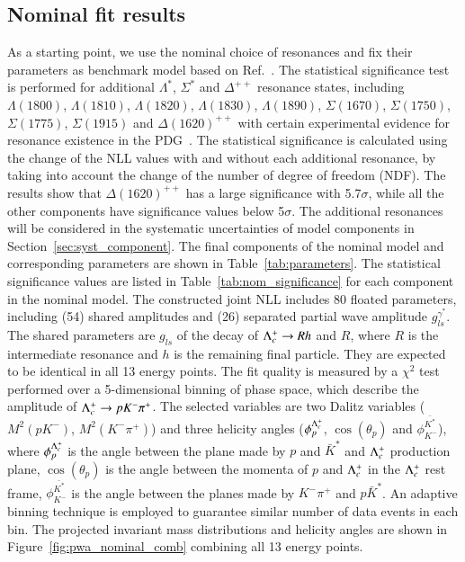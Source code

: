 \subsection{Nominal fit results}
\label{sec:nominal_fit}
As a starting point, we use the nominal choice of resonances and fix their parameters as benchmark model based on Ref.~\cite{LHCb:2022ouv}. The statistical significance test is performed for additional $\Lambda^*$, $\Sigma^*$ and $\Delta^{++}$ resonance states, including $\Lambda(1800)$, $\Lambda(1810)$, $\Lambda(1820)$, $\Lambda(1830)$, $\Lambda(1890)$, $\Sigma(1670)$, $\Sigma(1750)$, $\Sigma(1775)$, $\Sigma(1915)$ and $\Delta(1620)^{++}$ with certain experimental evidence for resonance existence in the PDG~\cite{Workman:2022ynf}.
The statistical significance is calculated using the change of the NLL values with and without each additional resonance, by taking into account the change of the number of degree of freedom (NDF). The results show that $\Delta(1620)^{++}$ has a large significance with 5.7$\sigma$, while all the other components have significance values below 5$\sigma$. The additional resonances will be considered in the systematic uncertainties of model components in Section~\ref{sec:syst_component}. 
The final components of the nominal model and corresponding parameters are shown in Table~\ref{tab:parameters}. The statistical significance values are listed in Table~\ref{tab:nom_significance} for each component in the nominal model. The constructed joint NLL includes 80 floated parameters, including (54) shared amplitudes and (26) separated partial wave amplitude $g_{ls}^{\gamma^*}$. The shared parameters are $g_{ls}$ of the decay of $\Lambda_{c}^{+} \rightarrow Rh$ and $R$, where $R$ is the intermediate resonance and $h$ is the remaining final particle. They are expected to be identical in all 13 energy points. The fit quality is measured by a $\chi^2$ test performed over a 5-dimensional binning of phase space, which describe the amplitude of $\Lambda_{c}^{+}\rightarrow p K^-\pi^+$. The selected variables are two Dalitz variables ($M^2(pK^-)$, $M^2(K^-\pi^+)$) and three helicity angles ($\phi_{p}^{\Lambda_{c}^{+}}$, $\cos(\theta_{p})$ and $\phi_{K^{-}}^{\bar{K^{*}}}$), where $\phi_{p}^{\Lambda_{c}^{+}}$ is the angle between the plane made by $p$ and $\bar{K}^*$ and $\Lambda_{c}^{+}$ production plane, $\cos(\theta_{p})$ is the angle between the momenta of $p$ and $\Lambda_{c}^{+}$ in the $\Lambda_{c}^{+}$ rest frame, $\phi_{K^{-}}^{\bar{K^{*}}}$ is the angle between the planes made by $K^-\pi^+$ and $p \bar{K}^*$. An adaptive binning technique is employed to guarantee similar number of data events in each bin. The projected invariant mass distributions and helicity angles are shown in Figure~\ref{fig:pwa_nominal_comb} combining all 13 energy points.

